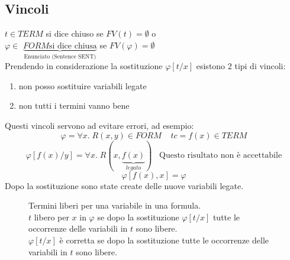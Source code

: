 \documentclass{article}
\theoremstyle{break}
\theoremstyle{break}
\theoremstyle{break}
\theoremstyle{break}
\begin{document}
\subsection{Vincoli}
\( t \in TERM \) si dice chiuso se \( FV(t) = \emptyset \) o\\
\( \varphi \in \) \( \underbrace{ FORM  \text{si dice chiusa}}_{\text{Enunciato (Sentence SENT)}} \)  se \( FV(\varphi) = \emptyset \)
\vspace{1em}\\
Prendendo in considerazione la sostituzione \( \varphi[t/x] \) esistono 2 tipi di vincoli:
\begin{enumerate}
  \item non posso sostituire variabili legate
  \item non tutti i termini vanno bene
\end{enumerate}
Questi vincoli servono ad evitare errori, ad esempio:
\[
  \varphi = \forall x.\; R(x,y) \in FORM\;\;\;\;tc=f(x) \in TERM
\] 
\[
  \varphi[f(x)/y] = \forall x.\; R(x, \underbrace{f(x)}_{legato})\;\;\; \text{Questo risultato non è accettabile}
\] 
\[
  \varphi[f(x),x] = \varphi
\] 
Dopo la sostituzione sono state create delle nuove variabili legate.
\begin{figure}[H]
  \begin{definition}
    Termini liberi per una variabile in una formula.
    \vspace{1em}\\
    \( t \) libero per \( x \) in \( \varphi \) se dopo la sostituzione \( \varphi[t/x] \) tutte
    le occorrenze delle variabili in \( t \) sono libere.
    \vspace{1em}\\
    \( \varphi[t/x] \) è corretta se dopo la sostituzione tutte le occorrenze
    delle variabili in \( t \) sono libere.
  \end{definition}
\end{figure}
\end{document}
